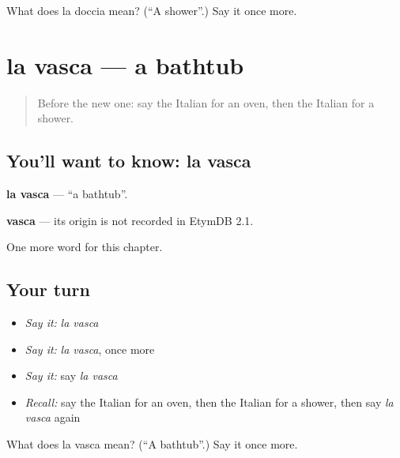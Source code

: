 \begin{tcolorbox}[breakable,colback=teal!4,colframe=teal!35!black,title={Before you move on}]
What does la doccia mean? (\textquotedblleft{}A shower\textquotedblright{}.) Say it once more.
\end{tcolorbox}
\section[la vasca]{la vasca — a bathtub}

\label{lesson:IT-C95-vasca}



\begin{quote}
Before the new one: say the Italian for an oven, then the Italian for a shower.
\end{quote}

\subsection*{You'll want to know: la vasca}
\textbf{la vasca} — \textquotedblleft{}a bathtub\textquotedblright{}.

\begin{cousinweb}
\textbf{vasca} — its origin is not recorded in EtymDB 2.1.
\end{cousinweb}

\begin{grammarlens}[title={What you've built}]
One more word for this chapter.
\end{grammarlens}

\subsection*{Your turn}
\begin{itemize}
\raggedright
  \item \emph{Say it:} \emph{la vasca}
  \item \emph{Say it:} \emph{la vasca}, once more
  \item \emph{Say it:} say \emph{la vasca}
  \item \emph{Recall:} say the Italian for an oven, then the Italian for a shower, then say \emph{la vasca} again
\end{itemize}

\begin{tcolorbox}[breakable,colback=teal!4,colframe=teal!35!black,title={Before you move on}]
What does la vasca mean? (\textquotedblleft{}A bathtub\textquotedblright{}.) Say it once more.
\end{tcolorbox}
